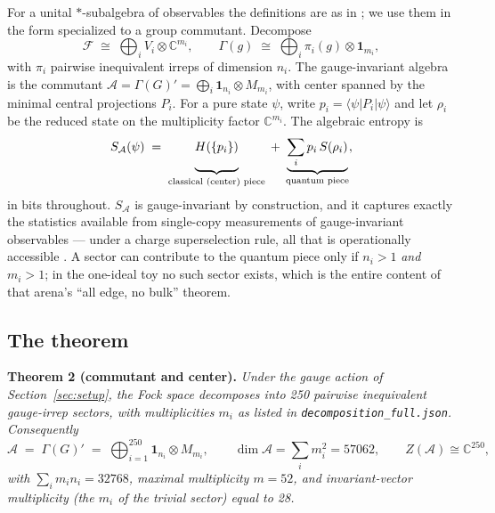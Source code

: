 \documentclass[11pt]{article}
\newcommand{\CC}{\mathbb{C}}
\newcommand{\Alg}{\mathcal{A}}
\newcommand{\SA}{S_{\mathcal{A}}}
\newcommand{\Fock}{\mathcal{F}}
\begin{document}
For a unital $*$-subalgebra of observables the definitions are as in \cite{barnum,zanardi,chr}; we use them in the form specialized to a group commutant. Decompose
\begin{equation*}
\Fock \;\cong\; \bigoplus_{i} V_i \otimes \CC^{m_i}, \qquad \Gamma(g) \;\cong\; \bigoplus_i \pi_i(g)\otimes\mathbf{1}_{m_i},
\end{equation*}
with $\pi_i$ pairwise inequivalent irreps of dimension $n_i$. The gauge-invariant algebra is the commutant $\Alg = \Gamma(G)' = \bigoplus_i \mathbf{1}_{n_i}\otimes M_{m_i}$, with center spanned by the minimal central projections $P_i$. For a pure state $\psi$, write $p_i = \langle\psi|P_i|\psi\rangle$ and let $\rho_i$ be the reduced state on the multiplicity factor $\CC^{m_i}$. The algebraic entropy is
\begin{equation}
\SA(\psi) \;=\; \underbrace{H(\{p_i\})\vphantom{\sum_i}}_{\text{classical (center) piece}} \;+\; \underbrace{\sum_i p_i\, S(\rho_i)}_{\text{quantum piece}},
\label{eq:salg}
\end{equation}
in bits throughout. $\SA$ is gauge-invariant by construction, and it captures exactly the statistics available from single-copy measurements of gauge-invariant observables --- under a charge superselection rule, all that is operationally accessible \cite{brs}. A sector can contribute to the quantum piece only if $n_i>1$ \emph{and} $m_i>1$; in the one-ideal toy no such sector exists, which is the entire content of that arena's ``all edge, no bulk'' theorem.

\subsection{The theorem}

\noindent\textbf{Theorem 2 (commutant and center).} \emph{Under the gauge action of Section~\ref{sec:setup}, the Fock space decomposes into 250 pairwise inequivalent gauge-irrep sectors, with multiplicities $m_i$ as listed in \texttt{decomposition\_full.json}. Consequently}
\begin{equation*}
\Alg \;=\; \Gamma(G)' \;=\; \bigoplus_{i=1}^{250} \mathbf{1}_{n_i}\otimes M_{m_i}, \qquad
\dim\Alg = \sum_i m_i^2 = 57062, \qquad Z(\Alg) \cong \CC^{250},
\end{equation*}
\emph{with $\sum_i m_i n_i = 32768$, maximal multiplicity $m = 52$, and invariant-vector multiplicity (the $m_i$ of the trivial sector) equal to 28.}

\medskip
\end{document}
